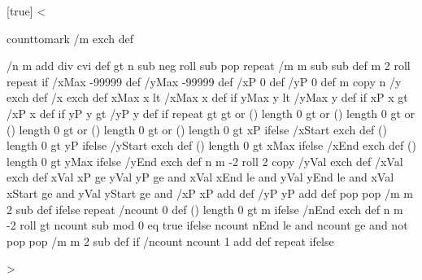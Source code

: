 %
\newif\ifPst@ChangeOrder
{}[true]{}
<{%
  counttomark /m exch def
  \ifPst@ChangeOrder
    /m0 m def
    m \psk@plotNoMax\space 1 add div 1 sub cvi {
      m0 \psk@plotNoMax\space 1 add roll /m0 m0 \psk@plotNoMax\space 1 add sub def
    } repeat
  \fi
  /n m \psk@plotNoMax{} add div cvi def
  \psk@plotNoMax{} gt {%
    n {
      \psk@plotNoMax\space \psk@plotNo{} sub neg roll %
      \psk@plotNoMax{} sub { pop } repeat %
      /m m \psk@plotNoMax{} sub sub def
      m 2 roll
    } repeat
  } if %
  /xMax -99999 def /yMax -99999 def
  /xP 0 def /yP 0 def
  m copy
  n {
    /y exch def /x exch def
    xMax x lt { /xMax x def } if
    yMax y lt {/yMax y def } if
    xP x gt { /xP x def } if
    yP y gt { /yP y def } if
  } repeat
  \psk@xStep{} gt \psk@yStep{} gt or (\psk@xStart) length 0 gt or
  (\psk@yStart) length 0 gt or (\psk@xEnd) length 0 gt or (\psk@yEnd) length 0 gt or {
%
    (\psk@xStart) length 0 gt {\psk@xStart\space }{ xP } ifelse /xStart exch def
    (\psk@yStart) length 0 gt {\psk@yStart\space }{ yP } ifelse /yStart exch def
    (\psk@xEnd) length 0 gt { \psk@xEnd\space }{ xMax } ifelse /xEnd exch def
    (\psk@yEnd) length 0 gt { \psk@yEnd\space }{ yMax } ifelse /yEnd exch def
    n {
      m -2 roll
      2 copy /yVal exch def /xVal exch def
      xVal xP ge
      yVal yP ge and
      xVal xEnd le and
      yVal yEnd le and
      xVal xStart ge and
      yVal yStart ge and {
        /xP xP \psk@xStep\space add def
        /yP yP \psk@yStep\space add def
      }{%
        pop pop
        /m m 2 sub def
      } ifelse
    } repeat
  }{%
    /ncount 0 def
    (\psk@nEnd) length 0 gt { \psk@nEnd\space }{ m } ifelse 
    /nEnd exch def
    n {
      m -2 roll
      \psk@nStep{} gt {
        ncount \psk@nStart\space sub \psk@nStep\space mod 0 eq }{ true } ifelse
        ncount nEnd le and
        ncount \psk@nStart\space ge and not {
          pop pop
          /m m 2 sub def
        } if
        /ncount ncount 1 add def
      } repeat
  } ifelse
}>
%
%
%
\newdimen\psk@llx
\newdimen\psk@lly

